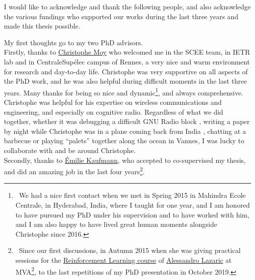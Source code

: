 
\begin{acknowledgements}


I would like to acknowledge and thank the following people, and also acknowledge the various fundings who supported our works during the last three years and made this thesis possible.

My first thoughts go to my two PhD advisors.\\
%
\indent
Firstly, thanks to \href{https://MoyChristophe.Wordpress.com/}{Christophe Moy} who welcomed me in the SCEE team, in IETR lab and in CentraleSupélec campus of Rennes, a very nice and warm environment for research and day-to-day life.
Christophe was very supportive on all aspects of the PhD work, and he was also helpful during difficult moments in the last three years. Many thanks for being so nice and dynamic\footnote{~We had a nice first contact when we met in Spring 2015 in Mahindra Ecole Centrale, in Hyderabad, India, where I taught for one year, and I am honored to have pursued my PhD under his supervision and to have worked with him, and I am also happy to have lived great human moments alongside Christophe since 2016.}, and always comprehensive.
Christophe was helpful for his expertise on wireless communications and engineering, and especially on cognitive radio.
Regardless of what we did together, whether it was debugging a difficult GNU Radio block \cite{Besson2018ICT,Besson2019WCNC}, writing a paper by night while Christophe was in a plane coming back from India \cite{MoyBesson2019}, chatting at a barbecue or playing ``palets'' together along the ocean in Vannes, I was lucky to collaborate with and be around Christophe.\\
%
\indent
Secondly, thanks to \href{http://chercheurs.lille.inria.fr/ekaufman/research.html}{Émilie Kaufmann}, who accepted to co-supervised my thesis, and did an amazing job in the last four years\footnote{~Since our first discussions, in Autumn 2015 when she was giving practical sessions for the \href{http://researchers.lille.inria.fr/~lazaric/Webpage/MVA-RL_Course15.html}{Reinforcement Learning course} of \href{http://researchers.lille.inria.fr/~lazaric/}{Alessandro Lazaric} at MVA\footnote{~\href{http://math.ens-paris-saclay.fr/version-francaise/formations/master-mva/}{Master Mathématiques Vision Apprentissage} at \href{https://www.ens-paris-saclay.fr/}{ENS de Paris-Saclay}, previously named \href{https://www.ens-cachan.fr}{ENS de Cachan}.}, to the last repetitions of my PhD presentation in October 2019.}.

\end{acknowledgements}
